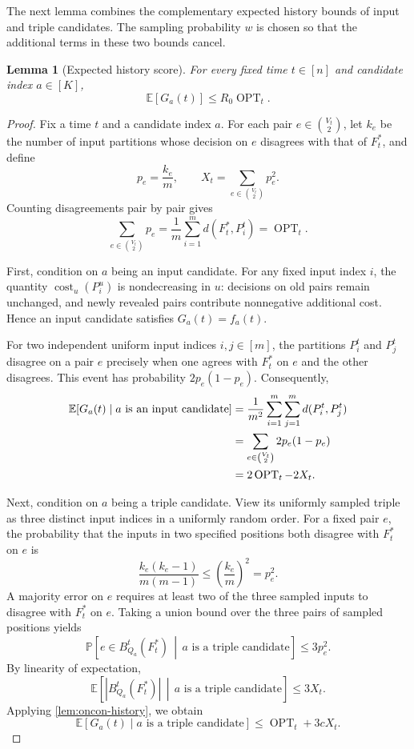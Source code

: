 \documentclass[11pt]{article}
\newtheorem{lemma}[theorem]{Lemma}
\theoremstyle{definition}
\theoremstyle{remark}
\newcommand{\OPT}{\operatorname{OPT}}
\newcommand{\cost}{\operatorname{cost}}
\newcommand{\1}{\mathbf{1}}
\newcommand{\E}{\mathbb{E}}
\newcommand{\Prb}{\mathbb{P}}
\begin{document}
The next lemma combines the complementary expected history bounds
of input and triple candidates. The sampling probability $w$ is
chosen so that the additional terms in these two bounds cancel.

\begin{lemma}[Expected history score]
\label{lem:oncon-expectation}
For every fixed time $t\in[n]$ and candidate index $a\in[K]$,
\[
    \E[G_a(t)]\leq R_0\OPT_t.
\]
\end{lemma}

\begin{proof}
Fix a time $t$ and a candidate index $a$. For each pair
$e\in\binom{V_t}{2}$, let $k_e$ be the number of input partitions
whose decision on $e$ disagrees with that of $F_t^*$, and define
\[
    p_e=\frac{k_e}{m},
    \qquad
    X_t=\sum_{e\in\binom{V_t}{2}}p_e^2.
\]
Counting disagreements pair by pair gives
\[
    \sum_{e\in\binom{V_t}{2}}p_e
    =
    \frac1m\sum_{i=1}^m d(F_t^*,P_i^t)
    =
    \OPT_t.
\]

First, condition on $a$ being an input candidate. For any fixed
input index $i$, the quantity $\cost_u(P_i^u)$ is nondecreasing in
$u$: decisions on old pairs remain unchanged, and newly revealed
pairs contribute nonnegative additional cost. Hence an input
candidate satisfies $G_a(t)=f_a(t)$.

For two independent uniform input indices $i,j\in[m]$, the
partitions $P_i^t$ and $P_j^t$ disagree on a pair $e$ precisely when
one agrees with $F_t^*$ on $e$ and the other disagrees. This event
has probability $2p_e(1-p_e)$. Consequently,
\begin{align}
    \E[G_a(t)\mid a\text{ is an input candidate}]
    &=
    \frac{1}{m^2}
    \sum_{i=1}^m\sum_{j=1}^m d(P_i^t,P_j^t)\notag\\
    &=
    \sum_{e\in\binom{V_t}{2}}2p_e(1-p_e)\notag\\
    &=
    2\OPT_t-2X_t.
    \label{eq:oncon-input-history}
\end{align}

Next, condition on $a$ being a triple candidate. View its uniformly
sampled triple as three distinct input indices in a uniformly
random order. For a fixed pair $e$, the probability that the inputs
in two specified positions both disagree with $F_t^*$ on $e$ is
\[
    \frac{k_e(k_e-1)}{m(m-1)}
    \leq
    \left(\frac{k_e}{m}\right)^2
    =
    p_e^2.
\]
A majority error on $e$ requires at least two of the three sampled
inputs to disagree with $F_t^*$ on $e$. Taking a union bound over
the three pairs of sampled positions yields
\[
    \Prb\!\left[
        e\in B_{Q_a}^t(F_t^*)
        \,\middle|\,
        a\text{ is a triple candidate}
    \right]
    \leq 3p_e^2.
\]
By linearity of expectation,
\begin{equation}\label{eq:oncon-majority-error}
    \E\!\left[
        |B_{Q_a}^t(F_t^*)|
        \,\middle|\,
        a\text{ is a triple candidate}
    \right]
    \leq 3X_t.
\end{equation}
Applying \cref{lem:oncon-history}, we obtain
\begin{equation}
    \E[G_a(t)\mid a\text{ is a triple candidate}]
    \leq
    \OPT_t+3cX_t.
    \label{eq:oncon-triple-history}
\end{equation}


\end{proof}
\end{document}

